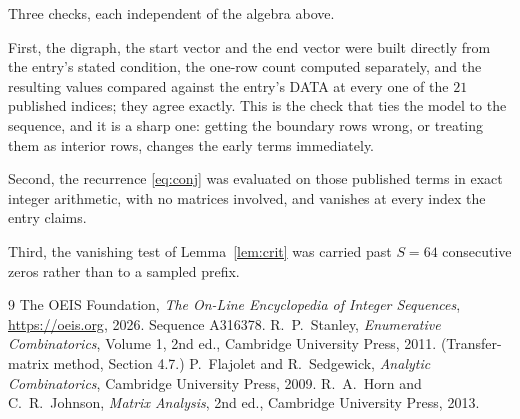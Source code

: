 \documentclass[11pt,a4paper]{article}
\theoremstyle{plain}
\theoremstyle{definition}
\begin{document}
Three checks, each independent of the algebra above.

First, the digraph, the start vector and the end vector were built directly from the
entry's stated condition, the one-row count computed separately, and the resulting values
compared against the entry's DATA at every one of the $21$ published indices; they
agree exactly. This is the check that ties the model to the sequence, and it is a sharp one:
getting the boundary rows wrong, or treating them as interior rows, changes the early terms
immediately.

Second, the recurrence \eqref{eq:conj} was evaluated on those published terms in exact
integer arithmetic, with no matrices involved, and vanishes at every index the entry claims.

Third, the vanishing test of Lemma~\ref{lem:crit} was carried past $S=64$ consecutive
zeros rather than to a sampled prefix.

\begin{thebibliography}{9}
 The OEIS Foundation, \emph{The On-Line Encyclopedia of Integer
Sequences}, \url{https://oeis.org}, 2026. Sequence A316378.
 R.~P.~Stanley, \emph{Enumerative Combinatorics}, Volume 1, 2nd ed.,
Cambridge University Press, 2011. (Transfer-matrix method, Section 4.7.)
 P.~Flajolet and R.~Sedgewick, \emph{Analytic Combinatorics}, Cambridge
University Press, 2009.
 R.~A.~Horn and C.~R.~Johnson, \emph{Matrix Analysis}, 2nd ed., Cambridge
University Press, 2013.
\end{thebibliography}
\end{document}
